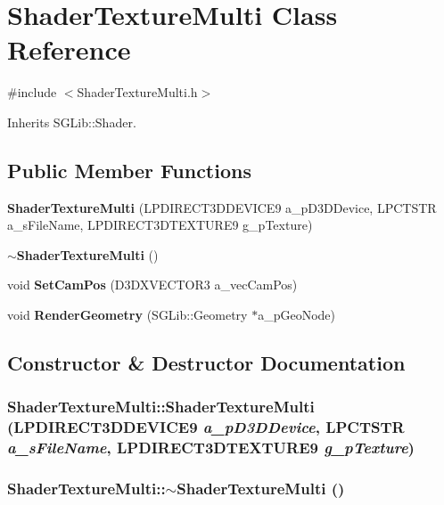 \section{ShaderTextureMulti Class Reference}
\label{class_shader_texture_multi}


{\ttfamily \#include $<$ShaderTextureMulti.h$>$}

Inherits SGLib::Shader.\subsection*{Public Member Functions}
\begin{DoxyCompactItemize}
\item 
{\bf ShaderTextureMulti} (LPDIRECT3DDEVICE9 a\_\-pD3DDevice, LPCTSTR a\_\-sFileName, LPDIRECT3DTEXTURE9 g\_\-pTexture)
\item 
{\bf $\sim$ShaderTextureMulti} ()
\item 
void {\bf SetCamPos} (D3DXVECTOR3 a\_\-vecCamPos)
\item 
void {\bf RenderGeometry} (SGLib::Geometry $\ast$a\_\-pGeoNode)
\end{DoxyCompactItemize}


\subsection{Constructor \& Destructor Documentation}
\subsubsection[{ShaderTextureMulti}]{\setlength{\rightskip}{0pt plus 5cm}ShaderTextureMulti::ShaderTextureMulti (LPDIRECT3DDEVICE9 {\em a\_\-pD3DDevice}, \/  LPCTSTR {\em a\_\-sFileName}, \/  LPDIRECT3DTEXTURE9 {\em g\_\-pTexture})\hspace{0.3cm}{\ttfamily  [inline]}}\label{class_shader_texture_multi_a55ca9f9bfb7d65ab89cf0a41b67fbf69}
\subsubsection[{$\sim$ShaderTextureMulti}]{\setlength{\rightskip}{0pt plus 5cm}ShaderTextureMulti::$\sim$ShaderTextureMulti ()\hspace{0.3cm}{\ttfamily  [inline]}}\label{class_shader_texture_multi_ac401c19016cd9bae283bd2b4fc91e84d}


